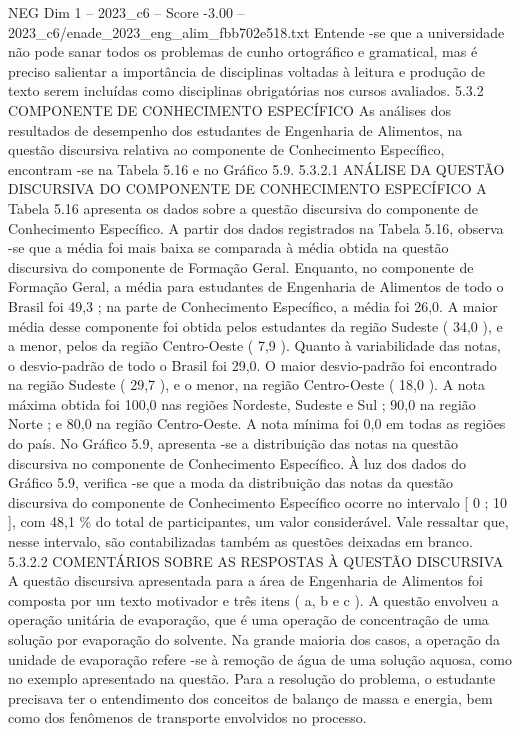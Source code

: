 \begin{textsample}{NEG Dim 1 – 2023\_c6 – Score -3.00 – 2023\_c6/enade\_2023\_eng\_alim\_fbb702e518.txt}
Entende -se que a universidade não pode sanar todos os problemas de cunho ortográfico e gramatical, mas é preciso salientar a importância de disciplinas voltadas à leitura e produção de texto serem incluídas como disciplinas obrigatórias nos cursos avaliados. 5.3.2 COMPONENTE DE CONHECIMENTO ESPECÍFICO As análises dos resultados de desempenho dos estudantes de Engenharia de Alimentos, na questão discursiva relativa ao componente de Conhecimento Específico, encontram -se na Tabela 5.16 e no Gráfico 5.9. 5.3.2.1 ANÁLISE DA QUESTÃO DISCURSIVA DO COMPONENTE DE CONHECIMENTO ESPECÍFICO A Tabela 5.16 apresenta os dados sobre a questão discursiva do componente de Conhecimento Específico.
A partir dos dados registrados na Tabela 5.16, observa -se que a média foi mais baixa se comparada à média obtida na questão discursiva do componente de Formação Geral.
Enquanto, no componente de Formação Geral, a média para estudantes de Engenharia de Alimentos de todo o Brasil foi 49,3 ; na parte de Conhecimento Específico, a média foi 26,0.
A maior média desse componente foi obtida pelos estudantes da região Sudeste ( 34,0 ), e a menor, pelos da região Centro-Oeste ( 7,9 ).
Quanto à variabilidade das notas, o desvio-padrão de todo o Brasil foi 29,0.
O maior desvio-padrão foi encontrado na região Sudeste ( 29,7 ), e o menor, na região Centro-Oeste ( 18,0 ).
A nota máxima obtida foi 100,0 nas regiões Nordeste, Sudeste e Sul ; 90,0 na região Norte ; e 80,0 na região Centro-Oeste.
A nota mínima foi 0,0 em todas as regiões do país.
No Gráfico 5.9, apresenta -se a distribuição das notas na questão discursiva no componente de Conhecimento Específico.
À luz dos dados do Gráfico 5.9, verifica -se que a moda da distribuição das notas da questão discursiva do componente de Conhecimento Específico ocorre no intervalo [ 0 ; 10 ], com 48,1 \% do total de participantes, um valor considerável.
Vale ressaltar que, nesse intervalo, são contabilizadas também as questões deixadas em branco. 5.3.2.2 COMENTÁRIOS SOBRE AS RESPOSTAS À QUESTÃO DISCURSIVA A questão discursiva apresentada para a área de Engenharia de Alimentos foi composta por um texto motivador e três itens ( a, b e c ).
A questão envolveu a operação unitária de evaporação, que é uma operação de concentração de uma solução por evaporação do solvente.
Na grande maioria dos casos, a operação da unidade de evaporação refere -se à remoção de água de uma solução aquosa, como no exemplo apresentado na questão.
Para a resolução do problema, o estudante precisava ter o entendimento dos conceitos de balanço de massa e energia, bem como dos fenômenos de transporte envolvidos no processo.

\end{textsample}
